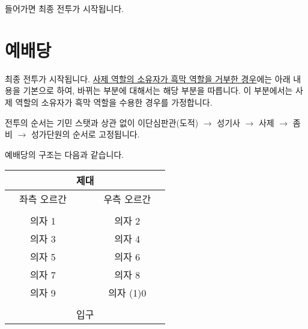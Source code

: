 \documentclass{report}
\begin{document}
					들어가면 최종 전투가 시작됩니다.
	
	\pagebreak
	\section{예배당}
		최종 전투가 시작됩니다. \hyperlink{alternative:no-criminal}{사제 역할의 소유자가 흑막 역할을 거부한 경우}에는 아래 내용을 기본으로 하여, 바뀌는 부분에 대해서는 해당 부분을 따릅니다. 이 부분에서는 사제 역할의 소유자가 흑막 역할을 수용한 경우를 가정합니다.
		
		전투의 순서는 기민 스탯과 상관 없이 이단심판관(도적) $\rightarrow$ 성기사 $\rightarrow$ 사제 $\rightarrow$ 좀비 $\rightarrow$ 성가단원의 순서로 고정됩니다.
		
		예배당의 구조는 다음과 같습니다.
		
		\begin{center}
			\begin{tabular}{p{1.5cm}p{1.5cm}p{1.5cm}|p{1.5cm}|p{1.5cm}|p{1.5cm}p{1.5cm}p{1.5cm}}
				\cline{4-5}
				&                         &   & \multicolumn{2}{c|}{제대} &                       &                       &                       \\ \hline
				\multicolumn{1}{|c|}{} & \multicolumn{2}{c|}{좌측 오르간} &            &            & \multicolumn{2}{c|}{우측 오르간}                   & \multicolumn{1}{c|}{} \\ \hline
				\multicolumn{1}{|c|}{} & \multicolumn{1}{c|}{}   &   & \multicolumn{1}{c|}{}	          & \multicolumn{1}{c|}{}	& \multicolumn{1}{c|}{} & \multicolumn{1}{c|}{} & \multicolumn{1}{c|}{} \\ \hline
				\multicolumn{1}{|c|}{} & \multicolumn{2}{c|}{의자 1}   &            &            & \multicolumn{2}{c|}{의자 2}                     & \multicolumn{1}{c|}{} \\ \hline
				\multicolumn{1}{|c|}{} & \multicolumn{2}{c|}{의자 3}   &            &            & \multicolumn{2}{c|}{의자 4}                     & \multicolumn{1}{c|}{} \\ \hline
				\multicolumn{1}{|c|}{} & \multicolumn{2}{c|}{의자 5}   &            &            & \multicolumn{2}{c|}{의자 6}                     & \multicolumn{1}{c|}{} \\ \hline
				\multicolumn{1}{|c|}{} & \multicolumn{2}{c|}{의자 7}   &            &            & \multicolumn{2}{c|}{의자 8}                     & \multicolumn{1}{c|}{} \\ \hline
				\multicolumn{1}{|c|}{} & \multicolumn{2}{c|}{의자 9}   &            &            & \multicolumn{2}{c|}{의자 (1)0}                     & \multicolumn{1}{c|}{} \\ \hline
				\multicolumn{1}{|c|}{} & \multicolumn{1}{c|}{}   &   & \multicolumn{1}{c|}{}	          & \multicolumn{1}{c|}{}	& \multicolumn{1}{c|}{} & \multicolumn{1}{c|}{} & \multicolumn{1}{c|}{} \\ \hline
				\multicolumn{1}{|c|}{} & \multicolumn{1}{c|}{}   &   & \multicolumn{2}{c|}{입구}	          & \multicolumn{1}{c|}{} & \multicolumn{1}{c|}{} & \multicolumn{1}{c|}{} \\ \hline
			\end{tabular}
		\end{center}
		
\end{document}
